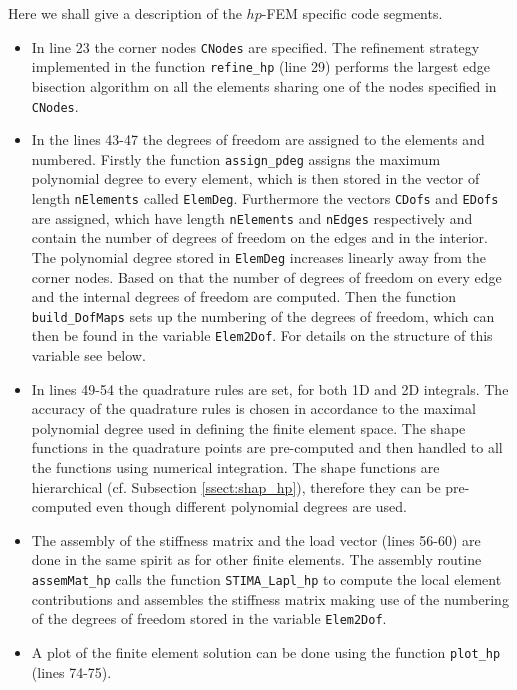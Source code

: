 Here we shall give a description of the $hp$-FEM specific code segments.
\begin{itemize}
 \item In line 23 the corner nodes \texttt{CNodes} are specified. The refinement strategy implemented in the function \texttt{refine\_hp} (line 29) performs the largest edge bisection algorithm on all the elements sharing one of the nodes specified in \texttt{CNodes}.
 
 \item In the lines 43-47 the degrees of freedom are assigned to the elements and numbered. Firstly the function \texttt{assign\_pdeg} assigns the maximum polynomial degree to every element, which is then stored in the vector of length \texttt{nElements} called \texttt{ElemDeg}. Furthermore the vectors \texttt{CDofs} and \texttt{EDofs} are assigned, which have length \texttt{nElements} and \texttt{nEdges} respectively and contain the number of degrees of freedom on the edges and in the interior. The polynomial degree stored in \texttt{ElemDeg} increases linearly away from the corner nodes. Based on that the number of degrees of freedom on every edge and the internal degrees of freedom are computed. Then the function \texttt{build\_DofMaps} sets up the numbering of the degrees of freedom, which can then be found in the variable \texttt{Elem2Dof}. For details on the structure of this variable see below.
 
 \item In lines 49-54 the quadrature rules are set, for both 1D and 2D integrals. The accuracy of the quadrature rules is chosen in accordance to the maximal polynomial degree used in defining the finite element space. The shape functions in the quadrature points are pre-computed and then handled to all the functions using numerical integration. The shape functions are hierarchical (cf. Subsection \ref{ssect:shap_hp}), therefore they can be pre-computed even though different polynomial degrees are used.
 
 \item The assembly of the stiffness matrix and the load vector (lines 56-60) are done in the same spirit as for other finite elements. The assembly routine \texttt{assemMat\_hp} calls the function \texttt{STIMA\_Lapl\_hp} to compute the local element contributions and assembles the stiffness matrix making use of the numbering of the degrees of freedom stored in the variable \texttt{Elem2Dof}.
 
 \item A plot of the finite element solution can be done using the function \texttt{plot\_hp} (lines 74-75).
\end{itemize}

